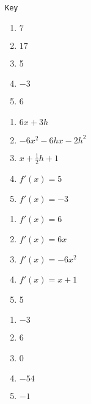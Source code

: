 \documentclass{article}
\newcounter{key}
\begin{document}
\texttt{Key}
\begin{multicols}{5}
\begin{enumerate}
    \item $7$
    \item $17$
    \item 5
    \item $-3$
    \item 6
\end{enumerate}     \setcounter{key}{\value{enumi}}
\end{multicols}
\begin{multicols}{5}
\begin{enumerate}   \setcounter{enumi}{\value{key}}
    \item $6x + 3h$
    \item $-6x^2 - 6hx - 2h^2$
    \item $x + \frac{1}{2}h + 1$
    \item $f'(x) = 5$
    \item $f'(x) = -3$
\end{enumerate}     \setcounter{key}{\value{enumi}}
\end{multicols}
\begin{multicols}{5}
\begin{enumerate}   \setcounter{enumi}{\value{key}}
    \item $f'(x) = 6$
    \item $f'(x) = 6x$
    \item $f'(x) = -6x^2$
    \item $f'(x) = x + 1$
    \item 5
\end{enumerate}     \setcounter{key}{\value{enumi}}
\end{multicols}
\begin{multicols}{5}
\begin{enumerate}   \setcounter{enumi}{\value{key}}
    \item $-3$
    \item 6
    \item 0
    \item $-54$
    \item $-1$
\end{enumerate}
\end{multicols}
\end{document}
